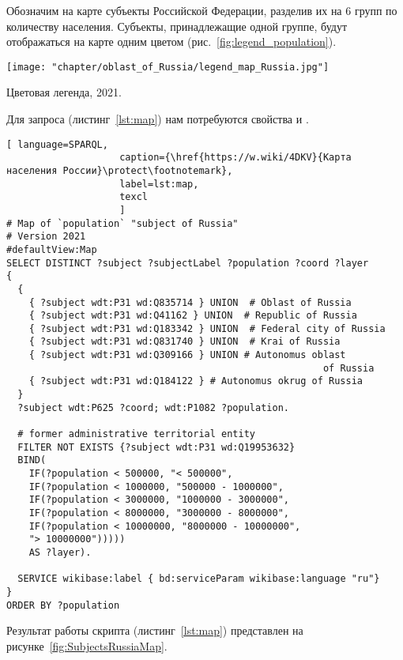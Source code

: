 Обозначим на карте субъекты Российской Федерации, разделив их на 6 групп по количеству населения. Субъекты, принадлежащие одной группе, будут отображаться на карте одним цветом (рис.~\ref{fig:legend_population}).

\begin{marginfigure}[0.0cm]
{
	\setlength{\fboxsep}{0pt}%
	\setlength{\fboxrule}{1pt}%
	\texttt{[image: "chapter/oblast\_of\_Russia/legend\_map\_Russia.jpg"]}
}
\caption [Цветовая легенда, 2021.]{Цветовая легенда, 2021.}%
\label{fig:legend_population}%
\end{marginfigure}

Для запроса (листинг~\protect\ref{lst:map}) нам потребуются свойства  и .

\begin{lstlisting}[ language=SPARQL, 
                    caption={\href{https://w.wiki/4DKV}{Карта населения России}\protect\footnotemark},
                    label=lst:map,
                    texcl 
                    ]
# Map of `population` "subject of Russia"
# Version 2021
#defaultView:Map
SELECT DISTINCT ?subject ?subjectLabel ?population ?coord ?layer
{
  {
    { ?subject wdt:P31 wd:Q835714 } UNION  # Oblast of Russia
    { ?subject wdt:P31 wd:Q41162 } UNION  # Republic of Russia
    { ?subject wdt:P31 wd:Q183342 } UNION  # Federal city of Russia
    { ?subject wdt:P31 wd:Q831740 } UNION  # Krai of Russia
    { ?subject wdt:P31 wd:Q309166 } UNION # Autonomus oblast 
                                                        of Russia
    { ?subject wdt:P31 wd:Q184122 } # Autonomus okrug of Russia
  }   
  ?subject wdt:P625 ?coord; wdt:P1082 ?population.
  
  # former administrative territorial entity
  FILTER NOT EXISTS {?subject wdt:P31 wd:Q19953632}
  BIND(
    IF(?population < 500000, "< 500000",
    IF(?population < 1000000, "500000 - 1000000",
    IF(?population < 3000000, "1000000 - 3000000",
    IF(?population < 8000000, "3000000 - 8000000",
    IF(?population < 10000000, "8000000 - 10000000",
    "> 10000000")))))
    AS ?layer).
  
  SERVICE wikibase:label { bd:serviceParam wikibase:language "ru"}
}
ORDER BY ?population
\end{lstlisting}%

Результат работы скрипта (листинг~\protect\ref{lst:map}) представлен на рисунке~\ref{fig:SubjectsRussiaMap}.

